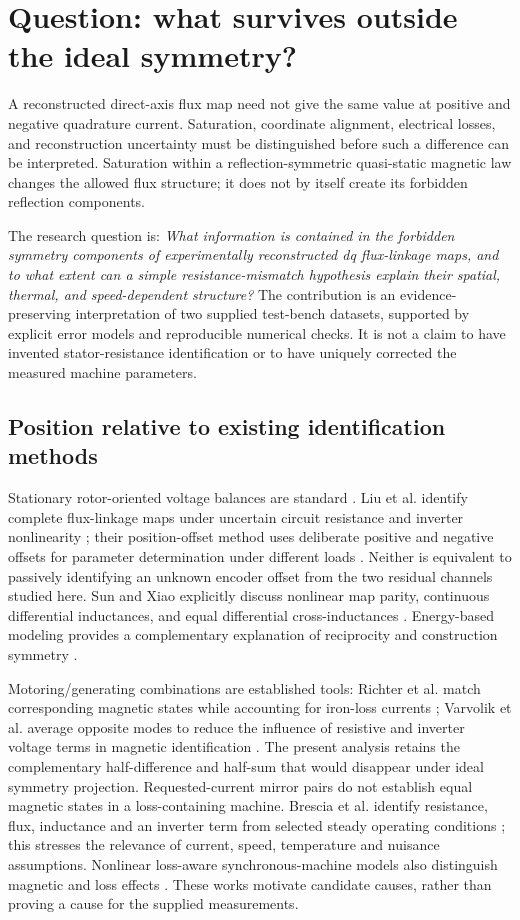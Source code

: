 \section{Question: what survives outside the ideal symmetry?}
A reconstructed direct-axis flux map need not give the same value at positive
and negative quadrature current. Saturation, coordinate alignment, electrical
losses, and reconstruction uncertainty must be distinguished before such a
difference can be interpreted. Saturation within a reflection-symmetric
quasi-static magnetic law changes the allowed flux structure; it does not by
itself create its forbidden reflection components.

The research question is: \emph{What information is contained in the forbidden
symmetry components of experimentally reconstructed dq flux-linkage maps, and
to what extent can a simple resistance-mismatch hypothesis explain their
spatial, thermal, and speed-dependent structure?} The contribution is an
evidence-preserving interpretation of two supplied test-bench datasets,
supported by explicit error models and reproducible numerical checks.
It is not a claim to have invented stator-resistance identification or to
have uniquely corrected the measured machine parameters.

\subsection{Position relative to existing identification methods}
Stationary rotor-oriented voltage balances are standard
\cite{binder2017,schroeder2021}. Liu et al. identify complete flux-linkage maps
under uncertain circuit resistance and inverter nonlinearity \cite{liu2018};
their position-offset method uses deliberate positive and negative offsets
for parameter determination under different loads \cite{liu2017}.
Neither is equivalent to passively identifying an unknown encoder offset
from the two residual channels studied here.
Sun and Xiao explicitly discuss nonlinear map parity, continuous differential
inductances, and equal differential cross-inductances \cite{sun2020}.
Energy-based modeling provides a complementary explanation of reciprocity
and construction symmetry \cite{jebai2014}.

Motoring/generating combinations are established tools: Richter et al.
match corresponding magnetic states while accounting for iron-loss currents
\cite{richter2014}; Varvolik et al. average opposite modes to reduce the
influence of resistive and inverter voltage terms in magnetic identification
\cite{varvolik2022}. The present analysis retains the complementary
half-difference and half-sum that would disappear under ideal symmetry
projection. Requested-current mirror pairs do not establish equal magnetic
states in a loss-containing machine.
Brescia et al. identify resistance, flux, inductance and an inverter term
from selected steady operating conditions \cite{brescia2023}; this stresses
the relevance of current, speed, temperature and nuisance assumptions.
Nonlinear loss-aware synchronous-machine models also distinguish magnetic
and loss effects \cite{hackl2021,kruener2019}. These works motivate candidate
causes, rather than proving a cause for the supplied measurements.

